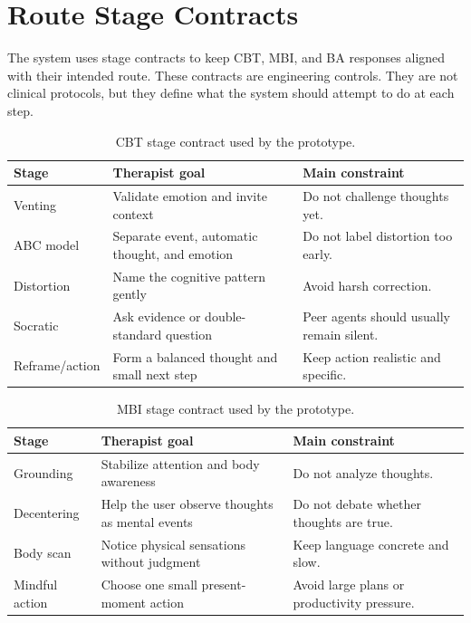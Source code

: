 \chapter{Route Stage Contracts}

The system uses stage contracts to keep CBT, MBI, and BA responses aligned with their intended route. These contracts are engineering controls. They are not clinical protocols, but they define what the system should attempt to do at each step.

\begin{table}[H]
\centering
\caption{CBT stage contract used by the prototype.}
\label{tab:appendix_cbt_contract}
\small
\begin{tabular}{p{}p{}p{}}
\toprule
Stage & Therapist goal & Main constraint \\
\midrule
Venting & Validate emotion and invite context & Do not challenge thoughts yet. \\
ABC model & Separate event, automatic thought, and emotion & Do not label distortion too early. \\
Distortion & Name the cognitive pattern gently & Avoid harsh correction. \\
Socratic & Ask evidence or double-standard question & Peer agents should usually remain silent. \\
Reframe/action & Form a balanced thought and small next step & Keep action realistic and specific. \\
\bottomrule
\end{tabular}
\end{table}

\begin{table}[H]
\centering
\caption{MBI stage contract used by the prototype.}
\label{tab:appendix_mbi_contract}
\small
\begin{tabular}{p{}p{}p{}}
\toprule
Stage & Therapist goal & Main constraint \\
\midrule
Grounding & Stabilize attention and body awareness & Do not analyze thoughts. \\
Decentering & Help the user observe thoughts as mental events & Do not debate whether thoughts are true. \\
Body scan & Notice physical sensations without judgment & Keep language concrete and slow. \\
Mindful action & Choose one small present-moment action & Avoid large plans or productivity pressure. \\
\bottomrule
\end{tabular}
\end{table}

